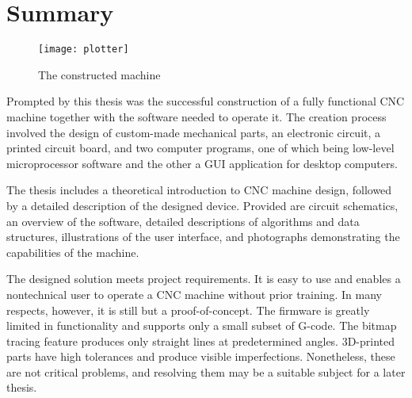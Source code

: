 \clearpage
\section{Summary}

\begin{figure}[ht]
    \begin{center}
        \texttt{[image: plotter]}
        \caption{The constructed machine}
    \end{center}
\end{figure}

Prompted by this thesis was the successful construction of a fully functional CNC
machine together with the software needed to operate it. The creation process
involved the design of custom-made mechanical parts, an electronic circuit,
a printed circuit board, and two computer programs, one of which being low-level
microprocessor software and the other a GUI application for desktop computers.

The thesis includes a theoretical introduction to CNC machine design, followed
by a detailed description of the designed device. Provided are circuit
schematics, an overview of the software, detailed descriptions of algorithms
and data structures, illustrations of the user interface, and photographs
demonstrating the capabilities of the machine.

The designed solution meets project requirements. It is easy to use and enables
a non\-technical user to operate a CNC machine without prior training. In many
respects, however, it is still but a proof-of-concept. The firmware is greatly
limited in functionality and supports only a small subset of G-code. The bitmap
tracing feature produces only straight lines at predetermined angles.
3D-printed parts have high tolerances and produce visible imperfections.
Nonetheless, these are not critical problems, and resolving them may be a
suitable subject for a later thesis.
